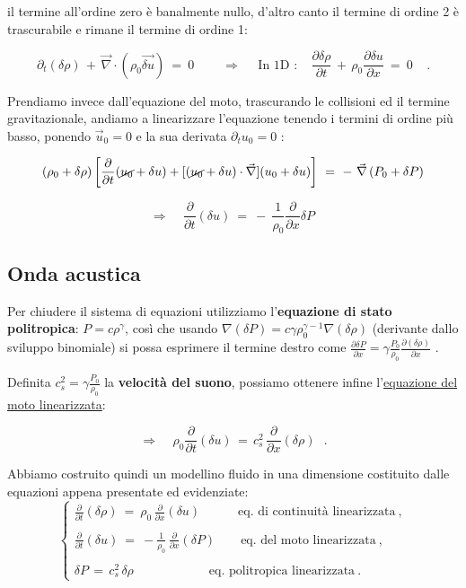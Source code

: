 il termine all'ordine zero è banalmente nullo, d'altro canto il termine di ordine 2 è trascurabile e rimane il termine di ordine 1:

\[\partial_t (\delta \rho)\,+\,\vec \nabla\cdot (\rho_0\vec{\delta u})\ = \ 0\ \ \ \ \ \ \ \ \ \ \Rightarrow \ \ \ \ \ \
\text{In 1D :}\ \ \ \  \boxed{ \ \displaystyle\frac{\partial \delta \rho}{\partial t}\, +\, \rho_0 \frac{\partial \delta u}{\partial x}\ =\ 0\ }\ \ \ \ .\]

\vspace{0.5cm}

Prendiamo invece dall'equazione del moto, trascurando le collisioni ed il termine gravitazionale, andiamo a linearizzare l'equazione tenendo i termini di ordine più basso, ponendo $\vec u_0 = 0$ e la sua derivata $\partial_t u_0 = 0$ :

\[ (\rho_0 + \delta \rho ) \left[ \frac{\partial}{\partial t}(\cancel{u_0}+\delta u) + [(\cancel{u_0} + \delta u)\cdot \vec \nabla] (u_0 + \delta u) \right] \ =\ -\ \vec \nabla \left( P_0 + \delta P \right)\]

\[\Rightarrow \ \ \ \ \boxed{\ \frac{\partial}{\partial t} (\delta u)\ =\ -\ \frac{1}{\rho_0}\frac{\partial}{\partial x}\delta P\ }\]

%
%
\subsection{Onda acustica}
Per chiudere il sistema di equazioni utilizziamo l'\textbf{equazione di stato politropica}: $\boxed{P = c\rho^\gamma}$, così che usando $\nabla (\delta P)=c\gamma \rho_0^{\gamma-1}\nabla (\delta \rho)$ (derivante dallo sviluppo binomiale) si possa esprimere il termine destro come $\displaystyle \frac{\partial \delta P}{\partial x} = \gamma \frac{P_0}{\rho_0} \frac{\partial (\delta \rho)}{\partial x}$ .

Definita $c_s^2 = \gamma \displaystyle \frac{P_0}{\rho_0}$ la \textbf{velocità del suono}, possiamo ottenere infine l'\underline{equazione del moto linearizzata}: 

\[\Rightarrow \ \ \ \  \boxed{\ \displaystyle \rho_0 \frac{\partial}{\partial t} (\delta u)\,=\, c_s^2\, \frac{\partial }{\partial x} (\delta \rho)\ }\ \ . \] 

Abbiamo costruito quindi un modellino fluido in una dimensione costituito dalle equazioni appena presentate ed evidenziate:
\[ \begin{cases}
	\displaystyle\frac{\partial }{\partial t} (\delta \rho)\ =\ \rho_0\, \displaystyle\frac{\partial}{\partial x} (\delta u)\qquad \quad\text{eq. di continuità linearizzata}\ ,\\ \\
	\displaystyle\frac{\partial }{\partial t} (\delta u)\ =\ - \displaystyle\frac{1}{\rho_0}\,\frac{\partial}{\partial x} (\delta P)\qquad \text{eq. del moto linearizzata}\ ,\\ \\
	\delta P\, =\, c_s^2\, \delta \rho\qquad \qquad\qquad \text{eq. politropica linearizzata}\ .
\end{cases} \]

